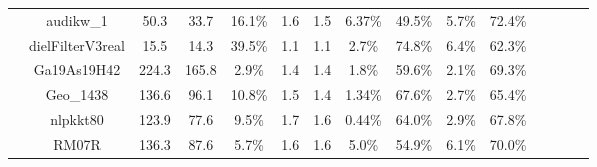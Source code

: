 \begin{tabular}{p{.75cm} cccccccccccccc}
%
&audikw\_1			& 50.3	& 33.7	& 16.1\%	& 1.6	& 1.5	& 6.37\%	& 49.5\%	& 5.7\% 	& 72.4\% 	\\
%
&dielFilterV3real	& 15.5	& 14.3	& 39.5\%	& 1.1	& 1.1	& 2.7\%	& 74.8\%	& 6.4\% 	& 62.3\% 	\\ 
%
%
&Ga19As19H42		& 224.3	& 165.8	& 2.9\%	& 1.4	& 1.4	& 1.8\%	& 59.6\%	& 2.1\% 	& 69.3\% 	\\
%
&Geo\_1438			& 136.6	& 96.1	& 10.8\%	& 1.5	& 1.4	& 1.34\%	& 67.6\%	& 2.7\% 	& 65.4\% 	\\
%
&nlpkkt80			& 123.9	& 77.6 & 9.5\%	& 1.7	& 1.6	& 0.44\%	& 64.0\%	& 2.9\% 	& 67.8\% 	\\
%
&RM07R				& 136.3	& 87.6	& 5.7\%	& 1.6	& 1.6	& 5.0\%	& 54.9\%	& 6.1\%	& 70.0\% 	\\

\bottomrule 
\end{tabular}  

